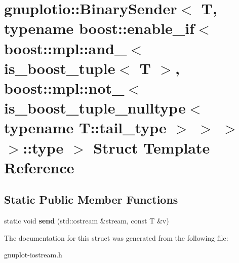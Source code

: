 \hypertarget{structgnuplotio_1_1BinarySender_3_01T_00_01typename_01boost_1_1enable__if_3_01boost_1_1mpl_1_1anab84516ea337555045555dbce2b6c996}{}\section{gnuplotio\+:\+:Binary\+Sender$<$ T, typename boost\+:\+:enable\+\_\+if$<$ boost\+:\+:mpl\+:\+:and\+\_\+$<$ is\+\_\+boost\+\_\+tuple$<$ T $>$, boost\+:\+:mpl\+:\+:not\+\_\+$<$ is\+\_\+boost\+\_\+tuple\+\_\+nulltype$<$ typename T\+:\+:tail\+\_\+type $>$ $>$ $>$ $>$\+:\+:type $>$ Struct Template Reference}
\label{structgnuplotio_1_1BinarySender_3_01T_00_01typename_01boost_1_1enable__if_3_01boost_1_1mpl_1_1anab84516ea337555045555dbce2b6c996}
\subsection*{Static Public Member Functions}
\begin{DoxyCompactItemize}
\item 
\mbox{\label{structgnuplotio_1_1BinarySender_3_01T_00_01typename_01boost_1_1enable__if_3_01boost_1_1mpl_1_1anab84516ea337555045555dbce2b6c996_a90bdbe9d299646a871882da19fdb30a9}} 
static void {\bfseries send} (std\+::ostream \&stream, const T \&v)
\end{DoxyCompactItemize}


The documentation for this struct was generated from the following file\+:\begin{DoxyCompactItemize}
\item 
gnuplot-\/iostream.\+h\end{DoxyCompactItemize}
